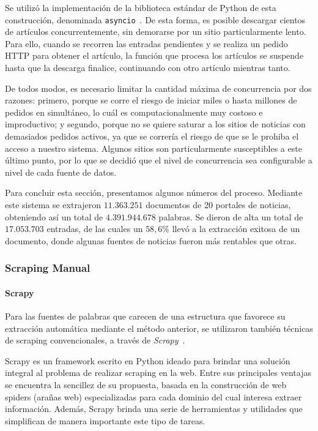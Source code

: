 Se utilizó la implementación de la biblioteca estándar de Python de esta construcción, denominada
\texttt{asyncio}~\cite{Asyncio}. De esta forma, es posible descargar cientos de artículos
concurrentemente, sin demorarse por un sitio particularmente lento. Para ello, cuando se recorren
las entradas pendientes y se realiza un pedido HTTP para obtener el artículo, la función que procesa
los artículos se suspende hasta que la descarga finalice, continuando con otro artículo mientras
tanto.

De todos modos, es necesario limitar la cantidad máxima de concurrencia por dos razones: primero,
porque se corre el riesgo de iniciar miles o hasta millones de pedidos en simultáneo, lo cuál es
computacionalmente muy costoso e improductivo; y segundo, porque no se quiere saturar a los sitios
de noticias con demasiados pedidos activos, ya que se correría el riesgo de que se le prohiba el
acceso a nuestro sistema. Algunos sitios son particularmente susceptibles a este último punto, por
lo que se decidió que el nivel de concurrencia sea configurable a nivel de cada fuente de datos.

Para concluir esta sección, presentamos algunos números del proceso. Mediante este sistema se
extrajeron $11.363.251$ documentos de 20 portales de noticias, obteniendo así un total de
$4.391.944.678$ palabras. Se dieron de alta un total de $17.053.703$ entradas, de las cuales
un $58,6\%$ llevó a la extracción exitosa de un documento, donde algunas fuentes de noticias
fueron más rentables que otras.


\subsubsection{Scraping Manual}

\paragraph{Scrapy}

Para las fuentes de palabras que carecen de una estructura que favorece su extracción automática
mediante el método anterior, se utilizaron también técnicas de scraping convencionales, a través de
\textit{Scrapy}~\cite{Scrapy}.

Scrapy es un framework escrito en Python ideado para brindar una solución integral al problema de
realizar scraping en la web. Entre sus principales ventajas se encuentra la sencillez de su
propuesta, basada en la construcción de web spiders (arañas web) especializadas para cada dominio
del cual interesa extraer información. Además, Scrapy brinda una serie de herramientas y utilidades
que simplifican de manera importante este tipo de tareas.

